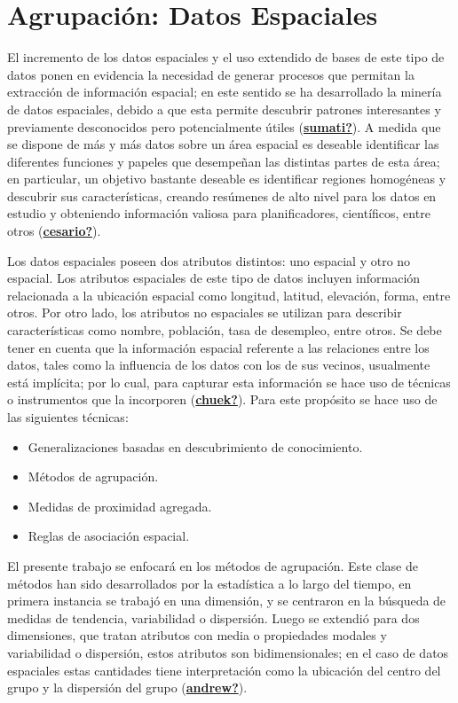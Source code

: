 \documentclass[
]{book}
\begin{document}
\hypertarget{agrupaciuxf3n-datos-espaciales}{%
\section{Agrupación: Datos Espaciales}\label{agrupaciuxf3n-datos-espaciales}}

El incremento de los datos espaciales y el uso extendido de bases de este tipo de datos ponen en evidencia la necesidad de generar procesos que permitan la extracción de información espacial; en este sentido se ha desarrollado la minería de datos espaciales, debido a que esta permite descubrir patrones interesantes y previamente desconocidos pero potencialmente útiles (\protect\hyperlink{ref-sumati}{\textbf{sumati?}}). A medida que se dispone de más y más datos sobre un área espacial es deseable identificar las diferentes funciones y papeles que desempeñan las distintas partes de esta área; en particular, un objetivo bastante deseable es identificar regiones homogéneas y descubrir sus características, creando resúmenes de alto nivel para los datos en estudio y obteniendo información valiosa para planificadores, científicos, entre otros (\protect\hyperlink{ref-cesario}{\textbf{cesario?}}).

Los datos espaciales poseen dos atributos distintos: uno espacial y otro no espacial. Los atributos espaciales de este tipo de datos incluyen información relacionada a la ubicación espacial como longitud, latitud, elevación, forma, entre otros. Por otro lado, los atributos no espaciales se utilizan para describir características como nombre, población, tasa de desempleo, entre otros. Se debe tener en cuenta que la información espacial referente a las relaciones entre los datos, tales como la influencia de los datos con los de sus vecinos, usualmente está implícita; por lo cual, para capturar esta información se hace uso de técnicas o instrumentos que la incorporen (\protect\hyperlink{ref-chuek}{\textbf{chuek?}}). Para este propósito se hace uso de las siguientes técnicas:

\begin{itemize}
\item
  Generalizaciones basadas en descubrimiento de conocimiento.
\item
  Métodos de agrupación.
\item
  Medidas de proximidad agregada.
\item
  Reglas de asociación espacial.
\end{itemize}

El presente trabajo se enfocará en los métodos de agrupación. Este clase de métodos han sido desarrollados por la estadística a lo largo del tiempo, en primera instancia se trabajó en una dimensión, y se centraron en la búsqueda de medidas de tendencia, variabilidad o dispersión. Luego se extendió para dos dimensiones, que tratan atributos con media o propiedades modales y variabilidad o dispersión, estos atributos son bidimensionales; en el caso de datos espaciales estas cantidades tiene interpretación como la ubicación del centro del grupo y la dispersión del grupo (\protect\hyperlink{ref-andrew}{\textbf{andrew?}}).
\end{document}
